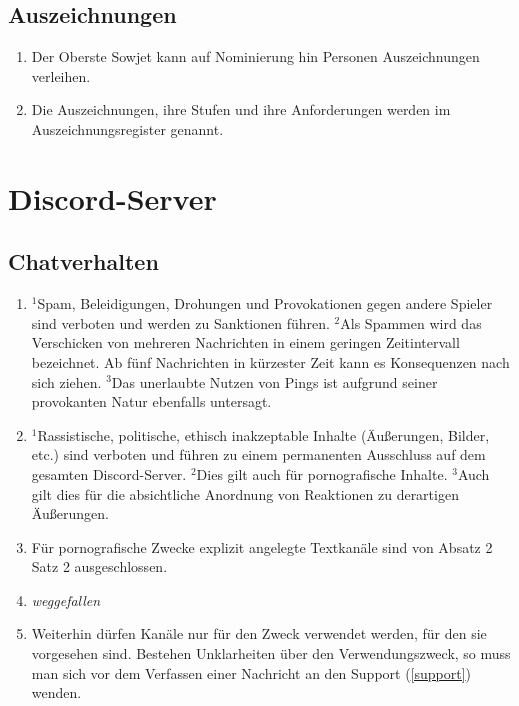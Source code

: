 \documentclass{article}
\begin{document}
\subsection{Auszeichnungen}
\begin{enumerate}[(1)]
    \item Der Oberste Sowjet kann auf Nominierung hin Personen Auszeichnungen verleihen.
    \item Die Auszeichnungen, ihre Stufen und ihre Anforderungen werden im Auszeichnungsregister genannt.
\end{enumerate}

\section{Discord-Server}

\subsection{Chatverhalten}\label{verhalten}
\begin{enumerate}[(1)]
	\item $^{1}$Spam, Beleidigungen, Drohungen und Provokationen gegen andere Spieler sind verboten und werden zu Sanktionen führen. $^{2}$Als Spammen wird das Verschicken von mehreren Nachrichten in einem geringen Zeitintervall bezeichnet. Ab fünf Nachrichten in kürzester Zeit kann es Konsequenzen nach sich ziehen. $^{3}$Das unerlaubte Nutzen von Pings ist aufgrund seiner provokanten Natur ebenfalls untersagt.
	\item $^{1}$Rassistische, politische, ethisch inakzeptable Inhalte (Äußerungen, Bilder, etc.) sind verboten und führen zu einem permanenten Ausschluss auf dem gesamten Discord-Server. $^{2}$Dies gilt auch für pornografische Inhalte. $^{3}$Auch gilt dies für die absichtliche Anordnung von Reaktionen zu derartigen Äußerungen.
	\item Für pornografische Zwecke explizit angelegte Textkanäle sind von Absatz 2 Satz 2 ausgeschlossen.
	\item \textit{weggefallen}
	\item Weiterhin dürfen Kanäle nur für den Zweck verwendet werden, für den sie vorgesehen sind. Bestehen Unklarheiten über den Verwendungszweck, so muss man sich vor dem Verfassen einer Nachricht an den Support (\ref{support}) wenden.
\end{enumerate}
\end{document}
